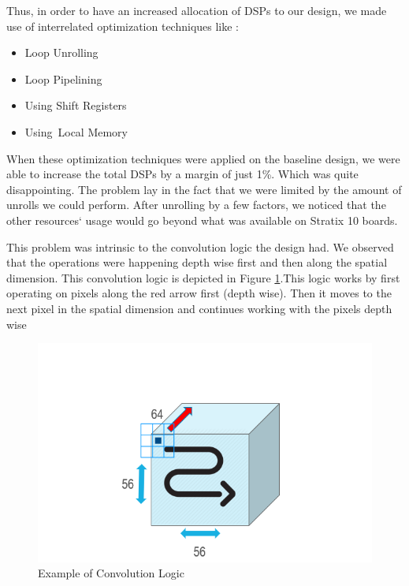  Thus, in order to have an increased allocation of DSPs to our design, we made use of interrelated  optimization techniques like : 
 \begin{itemize}
     \item Loop Unrolling
     \item Loop Pipelining
     \item Using Shift Registers
     \item Using Local Memory
\end{itemize}

When these optimization techniques were applied on the baseline design, we were able to increase the total DSPs by a margin of just 1\%. Which was quite disappointing. The problem lay in the fact that we were limited by the amount of unrolls we could perform. After unrolling by a few factors, we noticed that the other resources` usage would go beyond what was available on Stratix 10 boards.  

This problem was intrinsic to the convolution logic the design had. We observed that the operations were happening depth wise first and then along the spatial dimension. This convolution logic is depicted in Figure \ref{fig:GoogLeNet_Conv_logic}.This logic works by first operating on pixels along the red arrow first (depth wise). Then it moves to the next pixel in the spatial dimension and continues working with the pixels depth wise 

\begin{figure}[!htb]
  \includegraphics[width=\textwidth,height=\textheight,keepaspectratio]{img/GoogLeNet_Conv_logic.png}
  \caption{Example of Convolution Logic}
  \label{fig:GoogLeNet_Conv_logic}
\end{figure}

